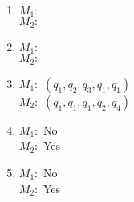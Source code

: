 \begin{enumerate}[label=\textbf{\alph*.}]
	\item $M_1:$  \\ $M_2:$ 
	\item $M_1:$  \\ $M_2:$ 
	\item $M_1:$ $(q_1, q_2, q_3, q_1, q_1)$ \\ $M_2:$ $(q_1, q_1, q_1, q_2, q_4)$
	\item $M_1:$ No \\ $M_2:$ Yes
	\item $M_1:$ No \\ $M_2:$ Yes
\end{enumerate} 